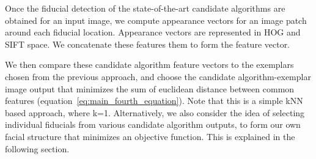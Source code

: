 \label{subsec:output_selection}

Once the fiducial detection of the state-of-the-art candidate algorithms are obtained for
an input image, we compute appearance 
vectors for an image patch around each fiducial location. Appearance vectors are represented 
in HOG and SIFT space. 
We concatenate these features them to form the feature vector.

We then compare these candidate algorithm feature vectors 
to the exemplars chosen from the previous approach,
and choose the candidate algorithm-exemplar image output that minimizes the sum of
euclidean distance between common features (equation~\ref{eq:main_fourth_equation}). Note that this is a simple kNN based approach,
where k=1. Alternatively, we also consider the idea of selecting individual fiducials
from various candidate algorithm outputs, to form our own facial structure that minimizes
an objective function. This is explained in the following section.
